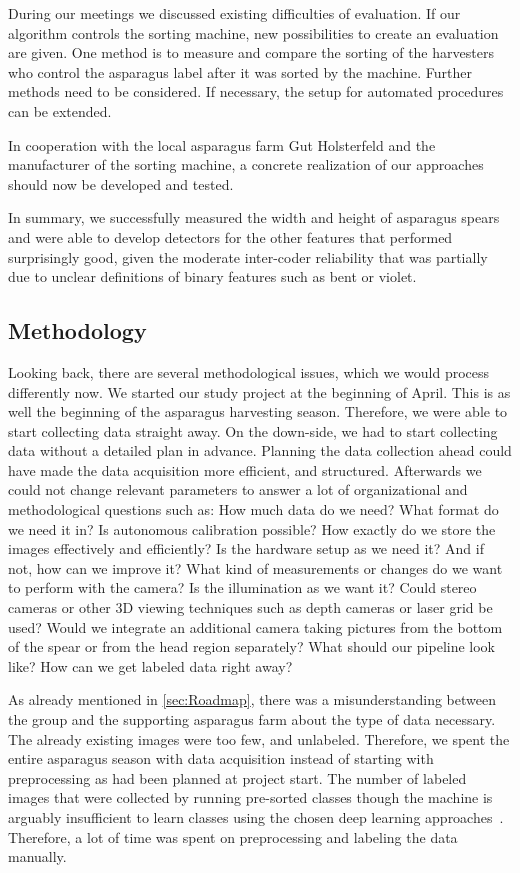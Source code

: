 During our meetings we discussed existing difficulties of evaluation. If our algorithm controls the sorting machine, new possibilities to create an evaluation are given. 
One method is to measure and compare the sorting of the harvesters who control the asparagus label after it was sorted by the machine. Further methods need to be considered. If necessary, the setup for automated procedures can be extended.

In cooperation with the local asparagus farm Gut Holsterfeld and the manufacturer of the sorting machine, a concrete realization of our approaches should now be developed and tested. 

\bigskip
In summary, we successfully measured the width and height of asparagus spears and were able to develop detectors for the other features that performed surprisingly good, given the moderate inter-coder reliability that was partially due to unclear definitions of binary features such as bent or violet.


\subsection{Methodology}
\label{sec:DiscussionMethodology}

Looking back, there are several methodological issues, which we would process differently now. We started our study project at the beginning of April. This is as well the beginning of the asparagus harvesting season. Therefore,  we were able to start collecting data straight away. On the down-side, we had to start collecting data without a detailed plan in advance. Planning the data collection ahead could have made the data acquisition more efficient, and structured. Afterwards we could not change relevant parameters to answer a lot of organizational and methodological questions such as: How much data do we need? What format do we need it in? Is autonomous calibration possible? How exactly do we store the images effectively and efficiently? Is the hardware setup as we need it? And if not, how can we improve it? What kind of measurements or changes do we want to perform with the camera? Is the illumination as we want it? Could stereo cameras or other 3D viewing techniques such as depth cameras or laser grid be used? Would we integrate an additional camera taking pictures from the bottom of the spear or from the head region separately?  What should our pipeline look like? How can we get labeled data right away?

\bigskip
As already mentioned in \autoref{sec:Roadmap}, there was a misunderstanding between the group and the supporting asparagus farm about the type of  data necessary. The already existing images were too few, and unlabeled. Therefore, we spent the entire asparagus season with data acquisition instead of starting with preprocessing as had been planned at project start. The number of labeled images that were collected by running pre-sorted classes though the machine is arguably insufficient to learn classes using the chosen deep learning approaches~\citep{russakovsky2013detecting,russakovsky2010attribute,how_many_images}. Therefore, a lot of time was spent on preprocessing and labeling the data manually. 

